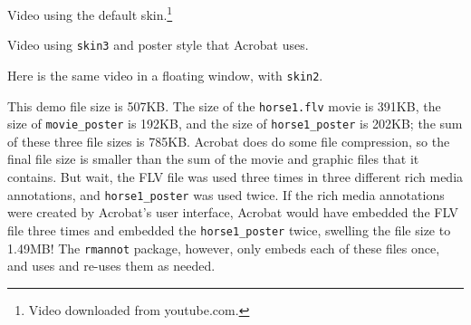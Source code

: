 \documentclass{article}
\begin{document}
\maketitle

\begin{center}
%
\end{center}

Video using the default skin.\footnote{Video downloaded from youtube.com.}

\newpage

\begin{center}
\resizebox{.75\linewidth}{!}
    {}%
\end{center}

Video using \texttt{skin3} and poster style that Acrobat uses.

Here is the same video in a floating window, with \texttt{skin2}.

\newpage

This demo file size is 507KB. The size of the \texttt{horse1.flv}
movie is 391KB, the size of \texttt{movie\_poster} is 192KB, and the
size of \texttt{horse1\_poster} is 202KB; the sum of these three
file sizes is 785KB. Acrobat does do some file compression, so the final
file size is smaller than the sum of the movie and graphic files
that it contains. But wait, the FLV file was used three times in
three different rich media annotations, and \texttt{horse1\_poster}
was used twice.  If the rich media annotations were created by
Acrobat's user interface, Acrobat would have embedded the FLV file
three times and embedded the \texttt{horse1\_poster} twice, swelling
the file size to 1.49MB! The \texttt{rmannot} package, however, only
embeds each of these files once, and uses and re-uses them as
needed.
\end{document}
